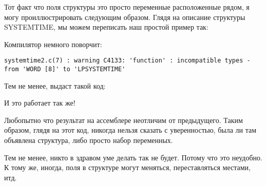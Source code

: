 Тот факт что поля структуры это просто переменные расположенные рядом, я могу проиллюстрировать следующим образом.
Глядя на описание структуры SYSTEMTIME, мы можем переписать наш простой пример так:



Компилятор немного поворчит:

\begin{lstlisting}
systemtime2.c(7) : warning C4133: 'function' : incompatible types - from 'WORD [8]' to 'LPSYSTEMTIME'
\end{lstlisting}

Тем не менее, выдаст такой код:



И это работает так же!

Любопытно что результат на ассемблере неотличим от предыдущего. Таким образом, глядя на этот код, 
никогда нельзя сказать с уверенностью, была ли там объявлена структура, либо просто набор переменных.

Тем не менее, никто в здравом уме делать так не будет. 
Потому что это неудобно. К тому же, иногда, поля в структуре могут меняться, переставляться местами, итд.


